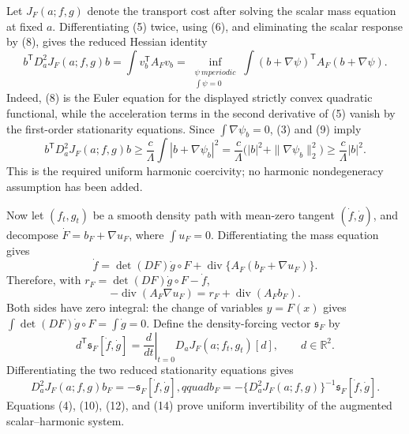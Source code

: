 Let \(J_F(a;f,g)\) denote the transport cost after solving the scalar mass equation at fixed \(a\).  Differentiating (5) twice, using (6), and eliminating the scalar response by (8), gives the reduced Hessian identity
\[
 b^{\mathsf T}D_a^2J_F(a;f,g)b
 =\int v_b^{\mathsf T}A_Fv_b
 =\inf_{\substack{\psi\ {
m periodic}\\ \int\psi=0}}
   \int(b+\nabla\psi)^{\mathsf T}A_F(b+\nabla\psi).                   \tag{9}
\]
Indeed, (8) is the Euler equation for the displayed strictly convex quadratic functional, while the acceleration terms in the second derivative of (5) vanish by the first-order stationarity equations.  Since \(\int\nabla\psi_b=0\), (3) and (9) imply
\[
 b^{\mathsf T}D_a^2J_F(a;f,g)b
 \geq\frac c\Lambda\int|b+\nabla\psi_b|^2
 =\frac c\Lambda\bigl(|b|^2+\|\nabla\psi_b\|_2^2\bigr)
 \geq\frac c\Lambda|b|^2.                                             \tag{10}
\]
This is the required uniform harmonic coercivity; no harmonic nondegeneracy assumption has been added.

Now let \((f_t,g_t)\) be a smooth density path with mean-zero tangent \((\dot f,\dot g)\), and decompose
\(\dot F=b_F+\nabla u_F\), where \(\int u_F=0\).  Differentiating the mass equation gives
\[
 \dot f=\det(DF)\dot g\circ F
       +\operatorname{div}\{A_F(b_F+\nabla u_F)\}.                     \tag{11}
\]
Therefore, with \(r_F=\det(DF)\dot g\circ F-\dot f\),
\[
 -\operatorname{div}(A_F\nabla u_F)
 =r_F+\operatorname{div}(A_Fb_F).                                     \tag{12}
\]
Both sides have zero integral: the change of variables \(y=F(x)\) gives \(\int\det(DF)\dot g\circ F=\int\dot g=0\).  Define the density-forcing vector \(\mathfrak s_F\) by
\[
 d^{\mathsf T}\mathfrak s_F[\dot f,\dot g]
 =\left.\frac d{dt}\right|_{t=0}D_aJ_F(a;f_t,g_t)[d],
 \qquad d\in\mathbb R^2.                                               \tag{13}
\]
Differentiating the two reduced stationarity equations gives
\[
 D_a^2J_F(a;f,g)b_F=-\mathfrak s_F[\dot f,\dot g],qquad
 b_F=-\{D_a^2J_F(a;f,g)\}^{-1}\mathfrak s_F[\dot f,\dot g].           \tag{14}
\]
Equations (4), (10), (12), and (14) prove uniform invertibility of the augmented scalar--harmonic system.

